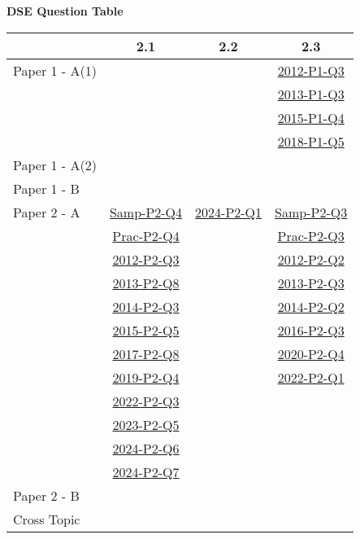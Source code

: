 \documentclass[12pt, a4paper]{article}
\begin{document}
\begin{absolutelynopagebreak}
\begin{center}
\textbf{DSE Question Table}
\end{center}
\begin{center}
\begin{tabular}{|l|c|c|c|}
\hline
        & 2.1 & 2.2 & 2.3 \\\hline
\hline
Paper 1 - A(1)&  &  & \hyperref[DSE2012-CoreP1-Q03]{2012-P1-Q3} \\
&  &  & \hyperref[DSE2013-CoreP1-Q03]{2013-P1-Q3} \\
&  &  & \hyperref[DSE2015-CoreP1-Q04]{2015-P1-Q4} \\
&  &  & \hyperref[DSE2018-CoreP1-Q05]{2018-P1-Q5} \\
\hline
Paper 1 - A(2)&  &  &  \\
\hline
Paper 1 - B&  &  &  \\
\hline
\hline
Paper 2 - A& \hyperref[DSE2012S-CoreP2-Q04]{Samp-P2-Q4} & \hyperref[DSE2024-CoreP2-Q01]{2024-P2-Q1} & \hyperref[DSE2012S-CoreP2-Q03]{Samp-P2-Q3} \\
& \hyperref[DSE2012P-CoreP2-Q04]{Prac-P2-Q4} &  & \hyperref[DSE2012P-CoreP2-Q03]{Prac-P2-Q3} \\
& \hyperref[DSE2012-CoreP2-Q03]{2012-P2-Q3} &  & \hyperref[DSE2012-CoreP2-Q02]{2012-P2-Q2} \\
& \hyperref[DSE2013-CoreP2-Q08]{2013-P2-Q8} &  & \hyperref[DSE2013-CoreP2-Q03]{2013-P2-Q3} \\
& \hyperref[DSE2014-CoreP2-Q03]{2014-P2-Q3} &  & \hyperref[DSE2014-CoreP2-Q02]{2014-P2-Q2} \\
& \hyperref[DSE2015-CoreP2-Q05]{2015-P2-Q5} &  & \hyperref[DSE2016-CoreP2-Q03]{2016-P2-Q3} \\
& \hyperref[DSE2017-CoreP2-Q08]{2017-P2-Q8} &  & \hyperref[DSE2020-CoreP2-Q04]{2020-P2-Q4} \\
& \hyperref[DSE2019-CoreP2-Q04]{2019-P2-Q4} &  & \hyperref[DSE2022-CoreP2-Q01]{2022-P2-Q1} \\
& \hyperref[DSE2022-CoreP2-Q03]{2022-P2-Q3} &  &  \\
& \hyperref[DSE2023-CoreP2-Q05]{2023-P2-Q5} &  &  \\
& \hyperref[DSE2024-CoreP2-Q06]{2024-P2-Q6} &  &  \\
& \hyperref[DSE2024-CoreP2-Q07]{2024-P2-Q7} &  &  \\
\hline
Paper 2 - B&  &  &  \\
\hline
\hline
Cross Topic&  &  &  \\
\hline
\end{tabular}
\end{center}
\end{absolutelynopagebreak}
\end{document}
